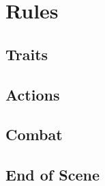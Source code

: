 \documentclass[a4paper,openany]{book}
\date{\today}
\begin{document}
\section*{Rules}

\begin{multicols}{2}

\subsection*{Traits}











\subsection*{Actions}






\subsection*{Combat}





\subsection*{End of Scene}



\end{multicols}
\end{document}
